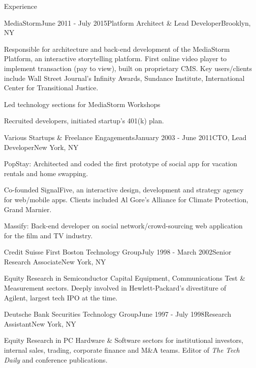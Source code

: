 \documentclass{resume} %
\begin{document}
\begin{rSection}{Experience}
\begin{rSubsection}{MediaStorm}{June 2011 - July 2015}{Platform Architect \& Lead Developer}{Brooklyn, NY}
\item Responsible for architecture and back-end development of the MediaStorm Platform, an interactive storytelling platform. First online video player to implement transaction (pay to view), built on proprietary CMS. Key users/clients include Wall Street Journal's Infinity Awards, Sundance Institute, International Center for Transitional Justice. 
\item Led technology sections for MediaStorm Workshops
\item Recruited developers, initiated startup's 401(k) plan.
\end{rSubsection}


\begin{rSubsection}{Various Startups \& Freelance Engagements}{January 2003 - June 2011}{CTO, Lead Developer}{New York, NY}
\item PopStay: Architected and coded the first prototype of social app for vacation rentals and home swapping.
\item Co-founded SignalFive, an interactive design, development and strategy agency for web/mobile apps. Clients included Al Gore's Alliance for Climate Protection, Grand Marnier. 
\item Massify: Back-end developer on social network/crowd-sourcing web application for the film and TV industry.
\end{rSubsection}


\begin{rSubsection}{Credit Suisse First Boston Technology Group}{July 1998 - March 2002}{Senior Research Associate}{New York, NY}
\item Equity Research in Semiconductor Capital Equipment, Communications Test \& Measurement sectors. Deeply involved in Hewlett-Packard's divestiture of Agilent, largest tech IPO at the time.
\end{rSubsection}


\begin{rSubsection}{Deutsche Bank Securities Technology Group}{June 1997 - July 1998}{Research Assistant}{New York, NY}
\item Equity Research in PC Hardware \& Software sectors for institutional investors, internal sales, trading, corporate finance and M\&A teams. Editor of \textit{The Tech Daily} and conference publications.
\end{rSubsection}

\end{rSection}
\end{document}
